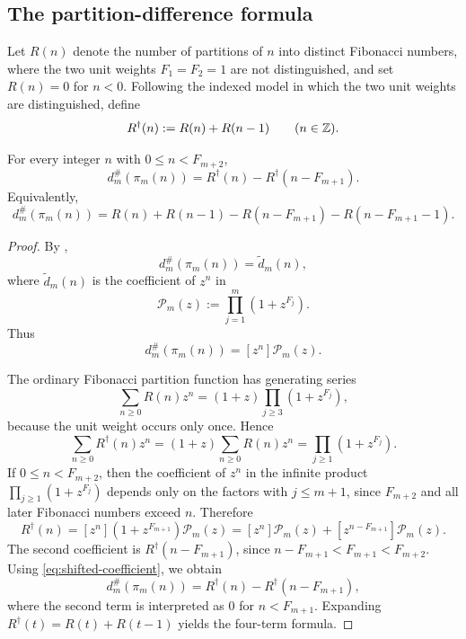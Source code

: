 \subsection{The partition-difference formula}

\begin{definition}
\label{def:partition-functions}
Let \(R(n)\) denote the number of partitions of \(n\) into distinct Fibonacci
numbers, where the two unit weights \(F_1=F_2=1\) are not distinguished, and
set \(R(n)=0\) for \(n<0\).  Following the indexed model in which the two unit
weights are distinguished, define
\[
  R^\dagger(n):=R(n)+R(n-1)
  \qquad (n\in\mathbb{Z}).
\]
\end{definition}

\begin{theorem}
\label{thm:partition-difference}
For every integer \(n\) with \(0\le n<F_{m+2}\),
\[
  d_m^\#(\pi_m(n))
  =
  R^\dagger(n)-R^\dagger(n-F_{m+1}).
\]
Equivalently,
\[
  d_m^\#(\pi_m(n))
  =
  R(n)+R(n-1)-R(n-F_{m+1})-R(n-F_{m+1}-1).
\]
\end{theorem}

\begin{proof}
By ,
\[
  d_m^\#(\pi_m(n))=\widetilde d_m(n),
\]
where \(\widetilde d_m(n)\) is the coefficient of \(z^n\) in
\[
  \mathcal P_m(z):=\prod_{j=1}^m(1+z^{F_j}).
\]
Thus
\begin{equation}\label{eq:shifted-coefficient}
  d_m^\#(\pi_m(n))=[z^n]\mathcal P_m(z).
\end{equation}

The ordinary Fibonacci partition function has generating series
\[
  \sum_{n\ge 0}R(n)z^n=(1+z)\prod_{j\ge 3}(1+z^{F_j}),
\]
because the unit weight occurs only once.  Hence
\begin{equation}\label{eq:indexed-generating}
  \sum_{n\ge 0}R^\dagger(n)z^n
  =
  (1+z)\sum_{n\ge 0}R(n)z^n
  =
  \prod_{j\ge 1}(1+z^{F_j}).
\end{equation}
If \(0\le n<F_{m+2}\), then the coefficient of \(z^n\) in the infinite product
\(\prod_{j\ge 1}(1+z^{F_j})\) depends only on the factors with \(j\le m+1\),
since \(F_{m+2}\) and all later Fibonacci numbers exceed \(n\).  Therefore
\[
  R^\dagger(n)
  =
  [z^n](1+z^{F_{m+1}})\mathcal P_m(z)
  =
  [z^n]\mathcal P_m(z)+[z^{n-F_{m+1}}]\mathcal P_m(z).
\]
The second coefficient is \(R^\dagger(n-F_{m+1})\), since
\(n-F_{m+1}<F_{m+1}<F_{m+2}\).  Using \eqref{eq:shifted-coefficient}, we
obtain
\[
  d_m^\#(\pi_m(n))
  =
  R^\dagger(n)-R^\dagger(n-F_{m+1}),
\]
where the second term is interpreted as \(0\) for \(n<F_{m+1}\).  Expanding
\(R^\dagger(t)=R(t)+R(t-1)\) yields the four-term formula.
\end{proof}

